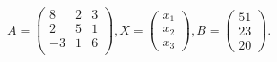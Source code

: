 \documentclass[12pt]{article}
\begin{document}
$ \begin{equation*}A=\begin{pmatrix}8 & 2 & 3 \\2 & 5 & 1 \\-3 & 1 & 6 \\\end{pmatrix}, X=\begin{pmatrix}x_1 \\x_2 \\x_3\end{pmatrix}, B = \begin{pmatrix}51 \\23 \\20\end{pmatrix}.\end{equation*} $
\end{document}
